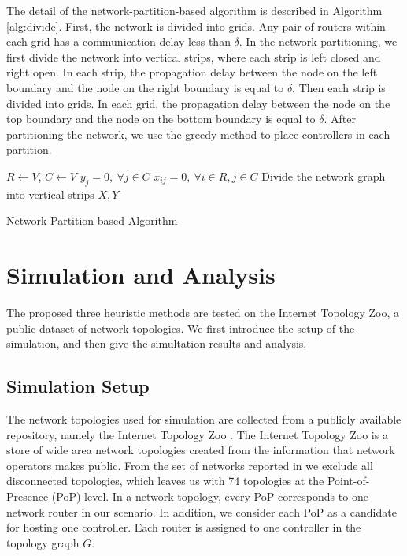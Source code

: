 \documentclass[conference]{IEEEtran}
\begin{document}
The detail of the network-partition-based algorithm is described in Algorithm \ref{alg:divide}. First, the network is divided into grids. Any pair of routers within each grid has a communication delay less than $\delta$.
In the network partitioning, we first divide the network into vertical strips, where each strip is left closed and right open. In each strip, the propagation delay between the node on the left boundary and the node on the right boundary is equal to $\delta$. Then each strip is divided into grids. In each grid, the propagation delay between the node on the top boundary and the node on the bottom boundary is equal to $\delta$. After partitioning the network, we use the greedy method to place controllers in each partition.

\begin{algorithm}[!htbp]
\BlankLine
$R\leftarrow V$, $C\leftarrow V$ \;
$y_j=0, \ \forall j\in C$ \;
$x_{ij}=0, \ \forall i\in R, j\in C$ \;
Divide the network graph into vertical strips \;
\Return $X, Y$
\caption{Network-Partition-based Algorithm}
\label{alg:divide}
\end{algorithm}


\section{Simulation and Analysis}
\label{sec:simulation}

The proposed three heuristic methods are tested on the Internet Topology Zoo, a public dataset of network topologies. We first introduce the setup of the simulation, and then give the simultation results and analysis.

\subsection{Simulation Setup}
The network topologies used for simulation are collected from a publicly available repository, namely the Internet Topology Zoo \cite{knight2011internet}. The Internet Topology Zoo is a store of wide area network topologies created from the information that network operators makes public. From the set of networks reported in \cite{knight2011internet} we exclude all disconnected topologies, which leaves us with 74 topologies at the Point-of-Presence (PoP) level. In a network topology, every PoP corresponds to one network router in our scenario. In addition, we consider each PoP as a candidate for hosting one controller. Each router is assigned to one controller in the topology graph $G$. 
\end{document}
